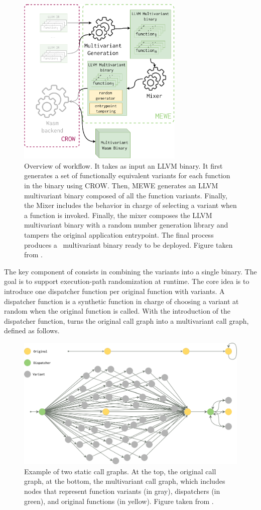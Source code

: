 \begin{figure}
  \centering
  \includegraphics[height=3.2in]{diagrams/MEWE.pdf}
  \caption{Overview of \tool workflow. It takes as input an LLVM binary. It first generates a set of functionally equivalent variants for each function in the binary using CROW. Then, MEWE generates an LLVM multivariant binary composed of all the function variants. Finally, the Mixer includes the behavior in charge of selecting a variant when a function is invoked. Finally, the \tool mixer composes the LLVM multivariant binary with a random number generation library and tampers the original application entrypoint. The final process produces a \wasm\ multivariant binary ready to be deployed. Figure taken from \cite{Lic}. }
  \label{workflow}
\end{figure}




The key component of \tool consists in combining the variants into a single binary.
The goal is to support execution-path randomization at runtime.
The core idea is to introduce one dispatcher function per original function with variants.
A dispatcher function is a synthetic function in charge of choosing a variant at random when the original function is called.
With the introduction of the dispatcher function,  \tool turns the original call graph into a multivariant call graph, defined as follows. 


\begin{figure}
    \centering
  \includegraphics[width=.8\linewidth]{diagrams/CFG.png}
  \caption{Example of two static call graphs. At the top, the original call graph, at the bottom, the multivariant call graph, which includes nodes that represent function variants (in gray), dispatchers (in green), and original functions  (in yellow). Figure taken from \cite{Lic}.
}
  \label{multivariant}
\end{figure}

